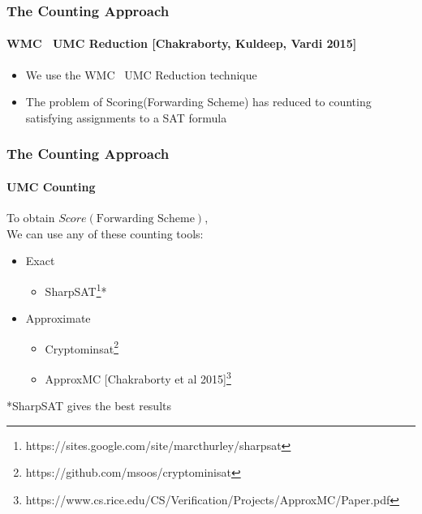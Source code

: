 \documentclass{beamer}
\begin{document}
\begin{frame}
\frametitle{The Counting Approach}
\framesubtitle{WMC \to \ UMC Reduction [Chakraborty, Kuldeep, Vardi 2015]}
	\begin{itemize}
		\item We use the WMC \to \ UMC Reduction technique
		\item The problem of Scoring(Forwarding Scheme) has reduced to counting satisfying assignments to a SAT formula
	\end{itemize}
\end{frame}

\begin{frame}
\frametitle{The Counting Approach}
\framesubtitle{UMC Counting}
	To obtain $Score(\text{Forwarding Scheme})$,\\
	We can use any of these counting tools:
	\begin{itemize}
	\item Exact
		\begin{itemize}
		\item SharpSAT\footnote{https://sites.google.com/site/marcthurley/sharpsat}*
		\end{itemize}

	\item Approximate
		\begin{itemize}
		\item Cryptominsat\footnote{https://github.com/msoos/cryptominisat}
		\item ApproxMC [Chakraborty et al 2015]\footnote{https://www.cs.rice.edu/CS/Verification/Projects/ApproxMC/Paper.pdf}\\[3ex]
		\end{itemize}
	\end{itemize}
	*SharpSAT gives the best results
\end{frame}
\end{document}
